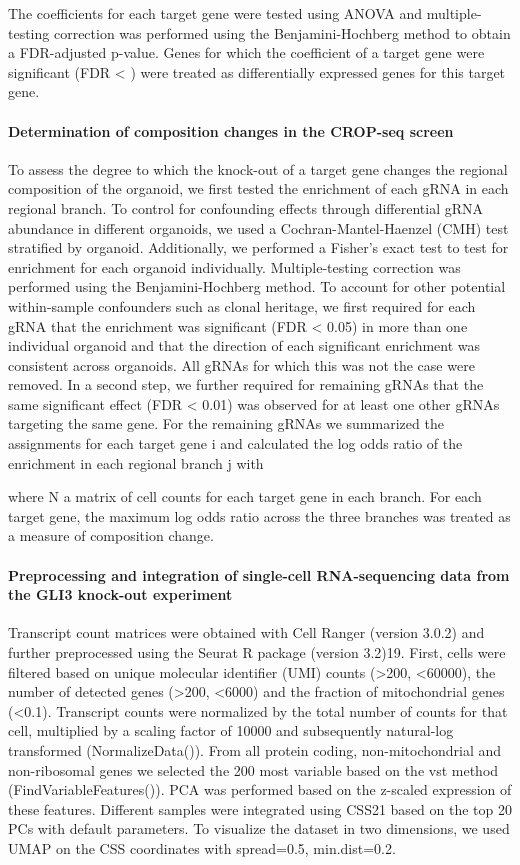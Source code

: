 The coefficients for each target gene were tested using ANOVA and multiple-testing correction was performed using the Benjamini-Hochberg method to obtain a FDR-adjusted p-value. Genes for which the coefficient of a target gene were significant (FDR < ) were treated as differentially expressed genes for this target gene.
 
 
\paragraph{Determination of composition changes in the CROP-seq screen}
To assess the degree to which the knock-out of a target gene changes the regional composition of the organoid, we first tested the enrichment of each gRNA in each regional branch. To control for confounding effects through differential gRNA abundance in different organoids, we used a Cochran-Mantel-Haenzel (CMH) test stratified by organoid. Additionally, we performed a Fisher’s exact test to test for enrichment for each organoid individually. Multiple-testing correction was performed using the Benjamini-Hochberg method. To account for other potential within-sample confounders such as clonal heritage, we first required for each gRNA that the enrichment was significant (FDR < 0.05) in more than one individual organoid and that the direction of each significant enrichment was consistent across organoids. All gRNAs for which this was not the case were removed. In a second step, we further required for remaining gRNAs that the same significant effect (FDR < 0.01) was observed for at least one other gRNAs targeting the same gene. For the remaining gRNAs we summarized the assignments for each target gene i  and calculated the log odds ratio of the enrichment in each regional branch j with
 
                        
 
where N a matrix of cell counts for each target gene in each branch. For each target gene, the maximum log odds ratio across the three branches was treated as a measure of composition change.
 
 
\paragraph{Preprocessing and integration of single-cell RNA-sequencing data from the GLI3 knock-out experiment}
Transcript count matrices were obtained with Cell Ranger (version 3.0.2) and further preprocessed using the Seurat R package (version 3.2)19. First, cells were filtered based on unique molecular identifier (UMI) counts (>200, <60000), the number of detected genes (>200, <6000) and the fraction of mitochondrial genes (<0.1). Transcript counts were normalized by the total number of counts for that cell, multiplied by a scaling factor of 10000 and subsequently natural-log transformed (NormalizeData()). From all protein coding, non-mitochondrial and non-ribosomal genes we selected the 200 most variable based on the vst method (FindVariableFeatures()).  PCA was performed based on the z-scaled expression of these features. Different samples were integrated using CSS21 based on the top 20 PCs with default parameters. To visualize the dataset in two dimensions, we used  UMAP on the CSS coordinates with spread=0.5, min.dist=0.2.
 
